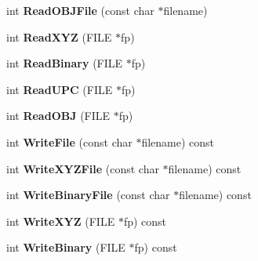 \begin{DoxyCompactItemize}
\item 
int {\bfseries Read\+O\+B\+J\+File} (const char $\ast$filename)\hypertarget{class_r3_surfel_block_a81a175f2051e7f461ca960ca95a6ee71}{}\label{class_r3_surfel_block_a81a175f2051e7f461ca960ca95a6ee71}

\item 
int {\bfseries Read\+X\+YZ} (F\+I\+LE $\ast$fp)\hypertarget{class_r3_surfel_block_af1df3a517d529a13f5a35be50d820a16}{}\label{class_r3_surfel_block_af1df3a517d529a13f5a35be50d820a16}

\item 
int {\bfseries Read\+Binary} (F\+I\+LE $\ast$fp)\hypertarget{class_r3_surfel_block_af6f23f900937c8b82a5f1b18b193744f}{}\label{class_r3_surfel_block_af6f23f900937c8b82a5f1b18b193744f}

\item 
int {\bfseries Read\+U\+PC} (F\+I\+LE $\ast$fp)\hypertarget{class_r3_surfel_block_a5027f4e066bd4a95b86ac245a85eefce}{}\label{class_r3_surfel_block_a5027f4e066bd4a95b86ac245a85eefce}

\item 
int {\bfseries Read\+O\+BJ} (F\+I\+LE $\ast$fp)\hypertarget{class_r3_surfel_block_a01fcf68db1a83d842ea69f76bce1c65a}{}\label{class_r3_surfel_block_a01fcf68db1a83d842ea69f76bce1c65a}

\item 
int {\bfseries Write\+File} (const char $\ast$filename) const \hypertarget{class_r3_surfel_block_ad327d8774893e93080212fb50c7c941a}{}\label{class_r3_surfel_block_ad327d8774893e93080212fb50c7c941a}

\item 
int {\bfseries Write\+X\+Y\+Z\+File} (const char $\ast$filename) const \hypertarget{class_r3_surfel_block_ad5e72fd198c2719649b0d280065a764c}{}\label{class_r3_surfel_block_ad5e72fd198c2719649b0d280065a764c}

\item 
int {\bfseries Write\+Binary\+File} (const char $\ast$filename) const \hypertarget{class_r3_surfel_block_a054f613a7422e1dd0828917ce1d55a3d}{}\label{class_r3_surfel_block_a054f613a7422e1dd0828917ce1d55a3d}

\item 
int {\bfseries Write\+X\+YZ} (F\+I\+LE $\ast$fp) const \hypertarget{class_r3_surfel_block_a40a96c3bd1cad78f86bf7da852e69853}{}\label{class_r3_surfel_block_a40a96c3bd1cad78f86bf7da852e69853}

\item 
int {\bfseries Write\+Binary} (F\+I\+LE $\ast$fp) const \hypertarget{class_r3_surfel_block_ae1e20bfcb9e14cc33f13ada232f77d2e}{}\label{class_r3_surfel_block_ae1e20bfcb9e14cc33f13ada232f77d2e}


\end{DoxyCompactItemize}
